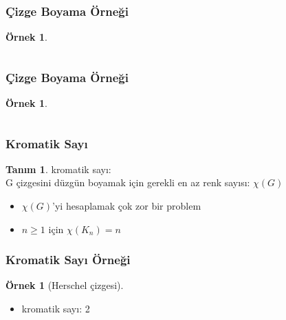 \documentclass[dvipsnames]{beamer}
\theoremstyle{definition}
\newtheorem{tanim}[theorem]{Tanım}
\theoremstyle{example}
\newtheorem{ornek}[theorem]{Örnek}
\theoremstyle{plain}
\begin{document}
\begin{frame}
  \frametitle{Çizge Boyama Örneği}

  \begin{ornek}
    \begin{columns}
      \begin{center}
      \end{center}

      \begin{center}
      \end{center}
    \end{columns}
  \end{ornek}
\end{frame}

\begin{frame}
  \frametitle{Çizge Boyama Örneği}

  \begin{ornek}
    \begin{columns}
      \begin{center}
      \end{center}

      \begin{center}
      \end{center}
    \end{columns}
  \end{ornek}
\end{frame}

\begin{frame}
  \frametitle{Kromatik Sayı}

  \begin{tanim}
    \alert{kromatik sayı}:\\
      G çizgesini düzgün boyamak için gerekli en az renk sayısı: $\chi (G)$
  \end{tanim}

  \pause
  \begin{itemize}
     \item $\chi (G)$'yi hesaplamak çok zor bir problem
     \item $n \geq 1$ için $\chi (K_n) = n$
  \end{itemize}
\end{frame}

\begin{frame}
  \frametitle{Kromatik Sayı Örneği}

  \begin{ornek}[Herschel çizgesi]
    \begin{center}
    \end{center}

    \begin{itemize}
      \item kromatik sayı: 2
    \end{itemize}
  \end{ornek}
\end{frame}
\end{document}
